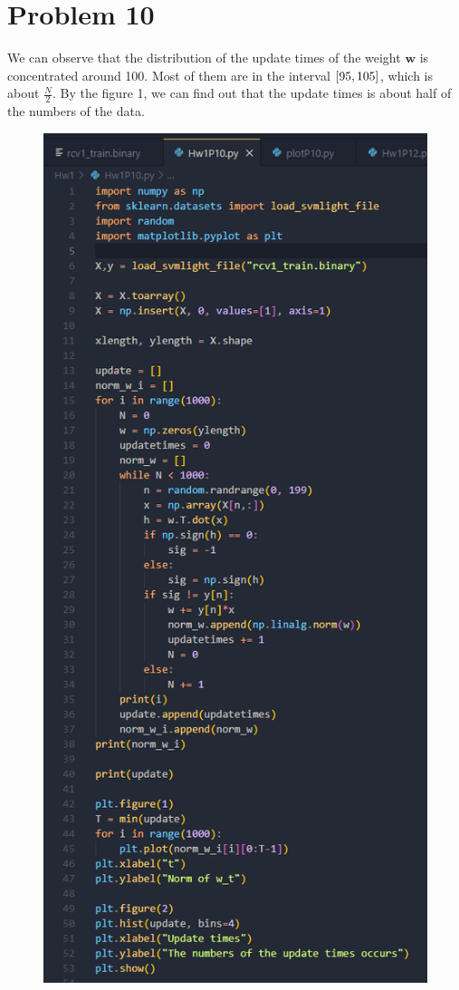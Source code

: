\documentclass[12pt,a4paper]{article}
\begin{document}
\section*{Problem 10}
We can observe that the distribution of the update times of the weight $\bm{w}$ is concentrated around 100.
Most of them are in the interval $\interval{95}{105}$, which is about $\frac{N}{2}$.
By the figure 1, we can find out that the update times is about half of the numbers of the data.
\begin{figure}[hbp]
    \centering
    \begin{minipage}{0.48\linewidth}
        \centering
        \includegraphics[width = \linewidth]{Hw1P10 snapshot.png}

\end{minipage}
\end{figure}
\end{document}
